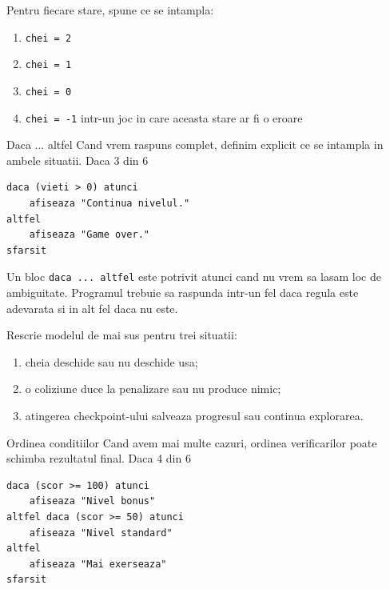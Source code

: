 \begin{guidebox}
Pentru fiecare stare, spune ce se intampla:
\begin{enumerate}
\item \texttt{chei = 2}
\item \texttt{chei = 1}
\item \texttt{chei = 0}
\item \texttt{chei = -1} intr-un joc in care aceasta stare ar fi o eroare
\end{enumerate}
\end{guidebox}

\clearpage

\PageHeader
  {Daca ... altfel}
  {Cand vrem raspuns complet, definim explicit ce se intampla in ambele situatii.}
  {Daca 3 din 6}

\begin{examplebox}
\begin{lstlisting}[style=codequest]
daca (vieti > 0) atunci
    afiseaza "Continua nivelul."
altfel
    afiseaza "Game over."
sfarsit
\end{lstlisting}
\end{examplebox}

\begin{conceptbox}
Un bloc \texttt{daca ... altfel} este potrivit atunci cand nu vrem sa lasam loc de ambiguitate. Programul trebuie sa raspunda intr-un fel daca regula este adevarata si in alt fel daca nu este.
\end{conceptbox}

\begin{semibox}
Rescrie modelul de mai sus pentru trei situatii:
\begin{enumerate}
\item cheia deschide sau nu deschide usa;
\item o coliziune duce la penalizare sau nu produce nimic;
\item atingerea checkpoint-ului salveaza progresul sau continua explorarea.
\end{enumerate}
\end{semibox}

\clearpage

\PageHeader
  {Ordinea conditiilor}
  {Cand avem mai multe cazuri, ordinea verificarilor poate schimba rezultatul final.}
  {Daca 4 din 6}

\begin{examplebox}
\begin{lstlisting}[style=codequest]
daca (scor >= 100) atunci
    afiseaza "Nivel bonus"
altfel daca (scor >= 50) atunci
    afiseaza "Nivel standard"
altfel
    afiseaza "Mai exerseaza"
sfarsit
\end{lstlisting}
\end{examplebox}

